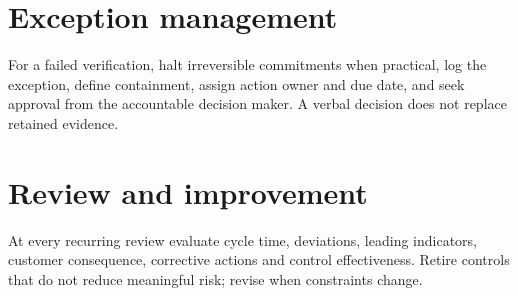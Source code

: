 \documentclass[11pt]{article}
\begin{document}
\section{Exception management}
For a failed verification, halt irreversible commitments when practical, log the exception, define containment, assign action owner and due date, and seek approval from the accountable decision maker. A verbal decision does not replace retained evidence.
\section{Review and improvement}
At every recurring review evaluate cycle time, deviations, leading indicators, customer consequence, corrective actions and control effectiveness. Retire controls that do not reduce meaningful risk; revise when constraints change.
\end{document}
